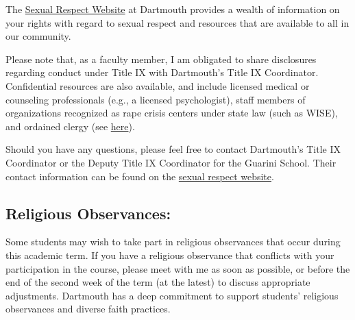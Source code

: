 \documentclass[11pt,letterpaper]{article}
\begin{document}
The \href{https://sexual-respect.dartmouth.edu}{Sexual Respect Website} at Dartmouth provides a wealth of information on your rights with regard to sexual respect and resources that are available to all in our community.

Please note that, as a faculty member, I am obligated to share disclosures regarding conduct under Title IX with Dartmouth's Title IX Coordinator. Confidential resources are also available, and include licensed medical or counseling professionals (e.g., a licensed psychologist), staff members of organizations recognized as rape crisis centers under state law (such as WISE), and ordained clergy (see \href{https://eoatix.dartmouth.edu}{here}).

Should you have any questions, please feel free to contact Dartmouth's Title IX Coordinator or the Deputy Title IX Coordinator for the Guarini School. Their contact information can be found on the \href{https://sexual-respect.dartmouth.edu}{sexual respect website}.

\subsection*{Religious Observances:}

Some students may wish to take part in religious observances that occur during this academic term. If you have a religious observance that conflicts with your participation in the course, please meet with me as soon as possible, or before the end of the second week of the term (at the latest) to discuss appropriate adjustments. Dartmouth has a deep commitment to support students' religious observances and diverse faith practices.
\end{document}
